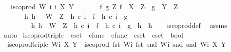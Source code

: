 \begin{isabellebody}
\ \ \ {\isachardoublequoteopen}is{\isacharunderscore}{\kern0pt}coprod\ W\ i\ i\ X\ Y\ {\isasymlongleftrightarrow}\ \isanewline
\ \ \ \ {\isacharparenleft}{\kern0pt}{\isasymforall}\ f\ g\ Z{\isachardot}{\kern0pt}\ {\isacharparenleft}{\kern0pt}f\ {\isacharcolon}{\kern0pt}\ X\ {\isasymrightarrow}\ Z\ {\isasymand}\ g\ {\isacharcolon}{\kern0pt}\ Y\ {\isasymrightarrow}\ Z{\isacharparenright}{\kern0pt}\ {\isasymlongrightarrow}\ \isanewline
\ \ \ \ \ \ {\isacharparenleft}{\kern0pt}{\isasymexists}\ h{\isachardot}{\kern0pt}\ h\ {\isacharcolon}{\kern0pt}\ \ W\ {\isasymrightarrow}\ Z\ {\isasymand}\ h\ {\isasymcirc}\isactrlsub c\ i\ {\isacharequal}{\kern0pt}\ f\ {\isasymand}\ h\ {\isasymcirc}\isactrlsub c\ i\ {\isacharequal}{\kern0pt}\ g\ {\isasymand}\isanewline
\ \ \ \ \ \ \ \ {\isacharparenleft}{\kern0pt}{\isasymforall}\ h{}{\isachardot}{\kern0pt}\ {\isacharparenleft}{\kern0pt}h{}\ {\isacharcolon}{\kern0pt}\ W\ {\isasymrightarrow}\ Z\ {\isasymand}\ h{}\ {\isasymcirc}\isactrlsub c\ i\ {\isacharequal}{\kern0pt}\ f\ {\isasymand}\ h{}\ {\isasymcirc}\isactrlsub c\ i\ {\isacharequal}{\kern0pt}\ g{\isacharparenright}{\kern0pt}\ {\isasymlongrightarrow}\ h{}\ {\isacharequal}{\kern0pt}\ h{\isacharparenright}{\kern0pt}{\isacharparenright}{\kern0pt}{\isacharparenright}{\kern0pt}{\isachardoublequoteclose}\isanewline
%
\isadelimproof
\ \ %
\endisadelimproof
%
\isatagproof
{}\isamarkupfalse%
\ is{\isacharunderscore}{\kern0pt}coprod{\isacharunderscore}{\kern0pt}def\ \isamarkupfalse%
\ assms\ \isamarkupfalse%
\ auto%
\endisatagproof
{\isafoldproof}%
%
\isadelimproof
\isanewline
%
\endisadelimproof
\isanewline
{}\isamarkupfalse%
\ is{\isacharunderscore}{\kern0pt}coprod{\isacharunderscore}{\kern0pt}triple\ {\isacharcolon}{\kern0pt}{\isacharcolon}{\kern0pt}\ {\isachardoublequoteopen}cset\ {\isasymtimes}\ cfunc\ {\isasymtimes}\ cfunc\ {\isasymRightarrow}\ cset\ {\isasymRightarrow}\ cset\ {\isasymRightarrow}\ bool{\isachardoublequoteclose}\ \isanewline
\ \ {\isachardoublequoteopen}is{\isacharunderscore}{\kern0pt}coprod{\isacharunderscore}{\kern0pt}triple\ Wi\ X\ Y\ {\isasymequiv}\ is{\isacharunderscore}{\kern0pt}coprod\ {\isacharparenleft}{\kern0pt}fst\ Wi{\isacharparenright}{\kern0pt}\ {\isacharparenleft}{\kern0pt}fst\ {\isacharparenleft}{\kern0pt}snd\ Wi{\isacharparenright}{\kern0pt}{\isacharparenright}{\kern0pt}\ {\isacharparenleft}{\kern0pt}snd\ {\isacharparenleft}{\kern0pt}snd\ Wi{\isacharparenright}{\kern0pt}{\isacharparenright}{\kern0pt}\ X\ Y{\isachardoublequoteclose}\isanewline

\end{isabellebody}
